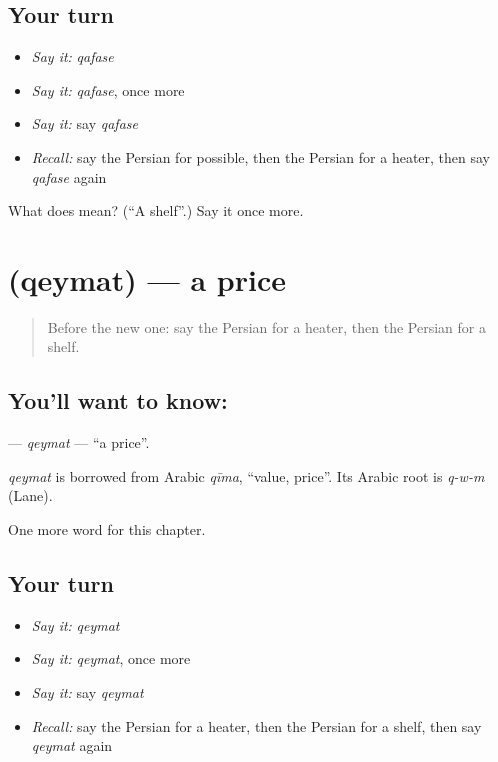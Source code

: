 \subsection*{Your turn}
\begin{itemize}
\raggedright
  \item \emph{Say it:} \emph{qafase}
  \item \emph{Say it:} \emph{qafase}, once more
  \item \emph{Say it:} say \emph{qafase}
  \item \emph{Recall:} say the Persian for possible, then the Persian for a heater, then say \emph{qafase} again
\end{itemize}

\begin{tcolorbox}[breakable,colback=teal!4,colframe=teal!35!black,title={Before you move on}]
What does  mean? (\textquotedblleft{}A shelf\textquotedblright{}.) Say it once more.
\end{tcolorbox}
\section[\texorpdfstring{\fa{قیمت} (qeymat)}{قیمت (qeymat)}]{ (qeymat) — a price}

\label{lesson:FA-C274-qeymat}



\begin{quote}
Before the new one: say the Persian for a heater, then the Persian for a shelf.
\end{quote}

\subsection*{You'll want to know: }
\textbf{} — \emph{qeymat} — \textquotedblleft{}a price\textquotedblright{}.

\begin{cousinweb}
\emph{qeymat} is borrowed from Arabic \emph{qīma}, \textquotedblleft{}value, price\textquotedblright{}. Its Arabic root is \emph{q-w-m} (Lane).
\end{cousinweb}

\begin{grammarlens}[title={What you've built}]
One more word for this chapter.
\end{grammarlens}

\subsection*{Your turn}
\begin{itemize}
\raggedright
  \item \emph{Say it:} \emph{qeymat}
  \item \emph{Say it:} \emph{qeymat}, once more
  \item \emph{Say it:} say \emph{qeymat}
  \item \emph{Recall:} say the Persian for a heater, then the Persian for a shelf, then say \emph{qeymat} again
\end{itemize}

